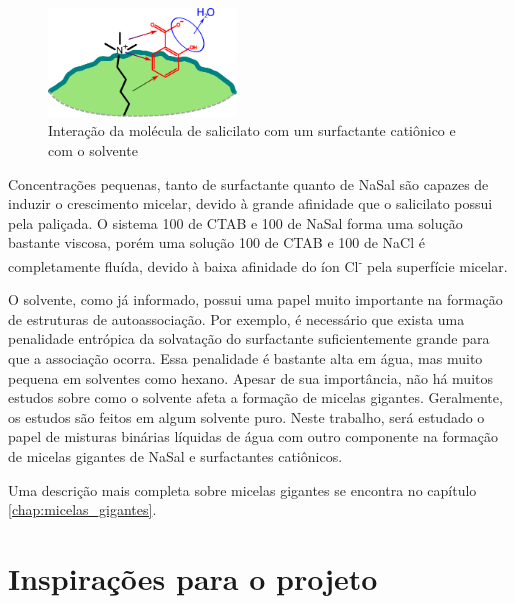 	\begin{figure}[H]
		\centering
		\includegraphics[width=5cm]{imagens/introducao/interacao_nasal_ctab}
		\caption{Interação da molécula de salicilato com um surfactante catiônico e com o solvente}
		\label{fig:interacao_nasal_ctab}
	\end{figure}
	
	Concentrações pequenas, tanto de surfactante quanto de NaSal são capazes de induzir o crescimento micelar, devido à grande afinidade que o salicilato possui pela paliçada. O sistema 100 \mM{} de CTAB e 100 \mM{} de NaSal forma uma solução bastante viscosa, porém uma solução 100 \mM{} de CTAB e 100 \mM{} de NaCl é completamente fluída, devido à baixa afinidade do íon Cl\textsuperscript{-} pela superfície micelar.
	

	
	
	O solvente, como já informado, possui uma papel muito importante na formação de estruturas de autoassociação. Por exemplo, é necessário que exista uma penalidade entrópica da solvatação do surfactante suficientemente grande para que a associação ocorra. Essa penalidade é bastante alta em água, mas muito pequena em solventes como hexano. Apesar de sua importância, não há muitos estudos sobre como o solvente afeta a formação de micelas gigantes. Geralmente, os estudos são feitos em algum solvente puro. Neste trabalho, será estudado o papel de misturas binárias líquidas de água com outro componente na formação de micelas gigantes de NaSal e surfactantes catiônicos.
	
	
	Uma descrição mais completa sobre micelas gigantes se encontra no capítulo \ref{chap:micelas_gigantes}.
	
	
	\chapter{Inspirações para o projeto}
